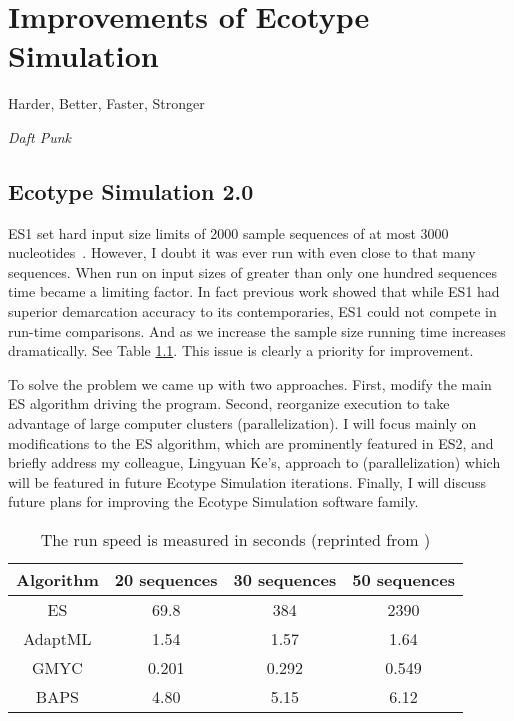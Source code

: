 \chapter{Improvements of Ecotype Simulation}

\begin{shadequote}
Harder, Better, Faster, Stronger \par\emph{Daft Punk}
\end{shadequote}


\section{Ecotype Simulation 2.0}
ES1 set hard input size limits of 2000 sample sequences of at most 3000 nucleotides~\cite{koeppel2008identifying}.
However, I doubt it was ever run with even close to that many sequences.
When run on input sizes of greater than only one hundred sequences time became a limiting factor.
In fact previous work showed that while ES1 had superior demarcation accuracy to its contemporaries, ES1 could not compete in run-time comparisons.
And as we increase the sample size running time increases dramatically.
See Table \ref{tab:ES1speed}.
This issue is clearly a priority for improvement.

To solve the problem we came up with two approaches.
First, modify the main ES algorithm driving the program.
Second, reorganize execution to take advantage of large computer clusters (parallelization).
I will focus mainly on modifications to the ES algorithm, which are prominently featured in ES2, and briefly address my colleague, Lingyuan Ke's, approach to (parallelization) which will be featured in future Ecotype Simulation iterations.
Finally, I will discuss future plans for improving the Ecotype Simulation software family.

\begin{table}
 \begin{tabular}{| c | c | c | c |}
  \hline
  Algorithm & 20 sequences & 30 sequences & 50 sequences \\ \hline
  ES & 69.8 & 384 & 2390 \\
  AdaptML & 1.54 & 1.57 & 1.64 \\
  GMYC & 0.201 & 0.292 & 0.549 \\
  BAPS & 4.80 & 5.15 & 6.12 \\
  \hline
 \end{tabular}
 \caption[ES1 run-time compared to other demarcation programs.]{The run speed is measured in seconds (reprinted from \protect\cite{carlo})}
 \label{tab:ES1speed}
\end{table}


